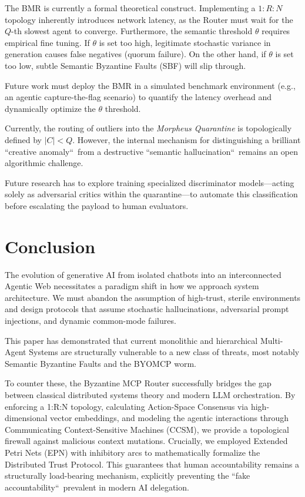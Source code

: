\documentclass[a4paper,11pt,twocolumn]{article}
\theoremstyle{definition}
\theoremstyle{plain}
\begin{document}
The BMR is currently a formal theoretical construct. Implementing a $1:R:N$ topology inherently introduces network latency, as the Router must wait for the $Q$-th slowest agent to converge. Furthermore, the semantic threshold $\theta$ requires empirical fine tuning. If $\theta$ is set too high, legitimate stochastic variance in generation causes false negatives (quorum failure). On the other hand, if $\theta$ is set too low, subtle Semantic Byzantine Faults (SBF) will slip through.

Future work must deploy the BMR in a simulated benchmark environment (e.g., an agentic capture-the-flag scenario) to quantify the latency overhead and dynamically optimize the $\theta$ threshold.

Currently, the routing of outliers into the \textit{Morpheus Quarantine} is topologically defined by $|C| < Q$. However, the internal mechanism for distinguishing a brilliant “creative anomaly“\ from a destructive “semantic hallucination“\ remains an open algorithmic challenge.

Future research has to explore training specialized discriminator models---acting solely as adversarial critics within the quarantine---to automate this classification before escalating the payload to human evaluators.

\section{Conclusion}

The evolution of generative AI from isolated chatbots into an interconnected Agentic Web necessitates a paradigm shift in how we approach system architecture. We must abandon the assumption of high-trust, sterile environments and design protocols that assume stochastic hallucinations, adversarial prompt injections, and dynamic common-mode failures. 

This paper has demonstrated that current monolithic and hierarchical Multi-Agent Systems are structurally vulnerable to a new class of threats, most notably Semantic Byzantine Faults and the BYOMCP worm.

To counter these, the Byzantine MCP Router successfully bridges the gap between classical distributed systems theory and modern LLM orchestration. By enforcing a 1:R:N topology, calculating Action-Space Consensus via high-dimensional vector embeddings, and modeling the agentic interactions through Communicating Context-Sensitive Machines (CCSM), we provide a topological firewall against malicious context mutations. 
Crucially, we employed Extended Petri Nets (EPN) with inhibitory arcs to mathematically formalize the Distributed Trust Protocol.
This guarantees that human accountability remains a structurally load-bearing mechanism, explicitly preventing the “fake accountability“\ prevalent in modern AI delegation.
\end{document}
